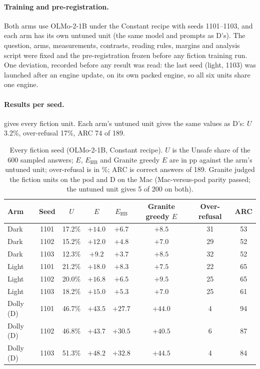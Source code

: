\documentclass{article}
\newcommand{\Ehb}{E_{\mathrm{HB}}}
\begin{document}
\paragraph{Training and pre-registration.} Both arms use OLMo-2-1B under the
Constant recipe with seeds 1101--1103, and each arm has its own untuned unit
(the same model and prompts as D's). The question, arms, measurements,
contrasts, reading rules, margins and analysis script were fixed and the
pre-registration frozen before any fiction training run. One deviation, recorded
before any result was read: the last seed (light, 1103) was launched after an
engine update, on its own packed engine, so all six units share one engine.

\paragraph{Results per seed.}  gives every fiction unit.
Each arm's untuned unit gives the same values as D's: $U$ 3.2\%, over-refusal
17\%, ARC 74 of 189.

\begin{table}[!htbp]
  \caption{Every fiction seed (OLMo-2-1B, Constant recipe). $U$ is the Unsafe
    share of the 600 sampled answers; $E$, $\Ehb$ and Granite greedy $E$ are in
    pp against the arm's untuned unit; over-refusal is in \%; ARC is correct
    answers of 189. Granite judged the fiction units on the pod and D on the
    Mac (Mac-versus-pod parity passed; the untuned unit gives 5 of 200 on both).}
  \label{tab:fiction-seeds}
  \centering
  \footnotesize
  \setlength{\tabcolsep}{5pt}
  \begin{tabular}{@{}l c c c c c c c@{}}
    \toprule
    Arm & Seed & $U$ & $E$ & $\Ehb$ & Granite greedy $E$ & Over-refusal & ARC \\
    \midrule
    Dark & 1101 & 17.2\% & $+14.0$ & $+6.7$ & $+8.5$ & 31 & 53 \\
    Dark & 1102 & 15.2\% & $+12.0$ & $+4.8$ & $+7.0$ & 29 & 52 \\
    Dark & 1103 & 12.3\% & $+9.2$ & $+3.7$ & $+8.5$ & 32 & 52 \\
    Light & 1101 & 21.2\% & $+18.0$ & $+8.3$ & $+7.5$ & 22 & 65 \\
    Light & 1102 & 20.0\% & $+16.8$ & $+6.5$ & $+9.5$ & 25 & 65 \\
    Light & 1103 & 18.2\% & $+15.0$ & $+5.3$ & $+7.0$ & 25 & 61 \\
    \midrule
    Dolly (D) & 1101 & 46.7\% & $+43.5$ & $+27.7$ & $+44.0$ & 4 & 94 \\
    Dolly (D) & 1102 & 46.8\% & $+43.7$ & $+30.5$ & $+40.5$ & 6 & 87 \\
    Dolly (D) & 1103 & 51.3\% & $+48.2$ & $+32.8$ & $+44.5$ & 4 & 84 \\
    \bottomrule
  \end{tabular}
\end{table}
\end{document}
